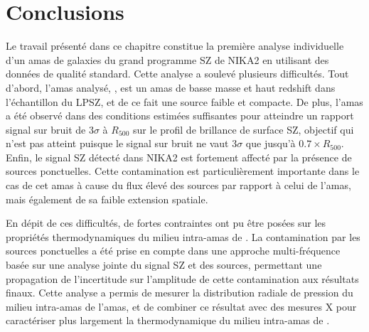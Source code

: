 \section{Conclusions}

Le travail présenté dans ce chapitre constitue la première analyse individuelle d'un amas de galaxies du grand programme SZ de NIKA2 en utilisant des données de qualité standard.
Cette analyse a soulevé plusieurs difficultés.
Tout d'abord, l'amas analysé, \act, est un amas de basse masse et haut redshift dans l'échantillon du LPSZ, et de ce fait une source faible et compacte.
De plus, l'amas a été observé dans des conditions estimées suffisantes pour atteindre un rapport signal sur bruit de $3\sigma$ à $R_{500}$ sur le profil de brillance de surface SZ, objectif qui n'est pas atteint puisque le signal sur bruit ne vaut $3\sigma$ que jusqu'à $0.7 \times R_{500}$.
Enfin, le signal SZ détecté dans NIKA2 est fortement affecté par la présence de sources ponctuelles.
Cette contamination est particulièrement importante dans le cas de cet amas à cause du flux élevé des sources par rapport à celui de l'amas, mais également de sa faible extension spatiale.

En dépit de ces difficultés, de fortes contraintes ont pu être posées sur les propriétés thermodynamiques du milieu intra-amas de \act.
La contamination par les sources ponctuelles a été prise en compte dans une approche multi-fréquence basée sur une analyse jointe du signal SZ et des sources, permettant une propagation de l'incertitude sur l'amplitude de cette contamination aux résultats finaux.
Cette analyse a permis de mesurer la distribution radiale de pression du milieu intra-amas de l'amas, et de combiner ce résultat avec des mesures X pour caractériser plus largement la thermodynamique du milieu intra-amas de \act.

